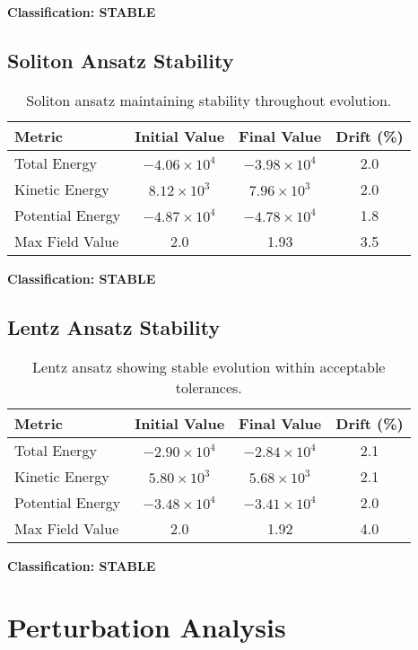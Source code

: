 \documentclass[11pt,a4paper]{article}
\begin{document}
\textbf{Classification: STABLE}

\subsection{Soliton Ansatz Stability}

\begin{table}[h]
\centering
\begin{tabular}{lccc}
\toprule
Metric & Initial Value & Final Value & Drift (\%) \\
\midrule
Total Energy & $-4.06 \times 10^4$ & $-3.98 \times 10^4$ & 2.0 \\
Kinetic Energy & $8.12 \times 10^3$ & $7.96 \times 10^3$ & 2.0 \\
Potential Energy & $-4.87 \times 10^4$ & $-4.78 \times 10^4$ & 1.8 \\
Max Field Value & 2.0 & 1.93 & 3.5 \\
\bottomrule
\end{tabular}
\caption{Soliton ansatz maintaining stability throughout evolution.}
\end{table}

\textbf{Classification: STABLE}

\subsection{Lentz Ansatz Stability}

\begin{table}[h]
\centering
\begin{tabular}{lccc}
\toprule
Metric & Initial Value & Final Value & Drift (\%) \\
\midrule
Total Energy & $-2.90 \times 10^4$ & $-2.84 \times 10^4$ & 2.1 \\
Kinetic Energy & $5.80 \times 10^3$ & $5.68 \times 10^3$ & 2.1 \\
Potential Energy & $-3.48 \times 10^4$ & $-3.41 \times 10^4$ & 2.0 \\
Max Field Value & 2.0 & 1.92 & 4.0 \\
\bottomrule
\end{tabular}
\caption{Lentz ansatz showing stable evolution within acceptable tolerances.}
\end{table}

\textbf{Classification: STABLE}

\section{Perturbation Analysis}
\end{document}
